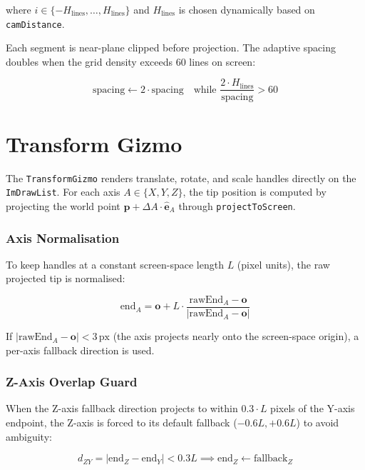 \documentclass[12pt, a4paper]{report}
\theoremstyle{definition}
\theoremstyle{remark}
\begin{document}
where $i \in \{-H_\text{lines}, \ldots, H_\text{lines}\}$ and
$H_\text{lines}$ is chosen dynamically based on \texttt{camDistance}.

Each segment is near-plane clipped before projection. The adaptive
spacing doubles when the grid density exceeds 60 lines on screen:

\begin{equation}
\text{spacing} \leftarrow 2 \cdot \text{spacing}
\quad \text{while } \frac{2 \cdot H_\text{lines}}{\text{spacing}} > 60
\end{equation}

\section{Transform Gizmo}

The \texttt{TransformGizmo} renders translate, rotate, and scale handles
directly on the \texttt{ImDrawList}. For each axis $A \in \{X, Y, Z\}$,
the tip position is computed by projecting the world point
$\mathbf{p} + \Delta A \cdot \hat{\mathbf{e}}_A$ through
\texttt{projectToScreen}.

\subsubsection{Axis Normalisation}

To keep handles at a constant screen-space length $L$ (pixel units),
the raw projected tip is normalised:

\begin{equation}
\text{end}_A = \mathbf{o} + L \cdot \frac{\text{rawEnd}_A - \mathbf{o}}{|\text{rawEnd}_A - \mathbf{o}|}
\end{equation}

If $|\text{rawEnd}_A - \mathbf{o}| < 3\,\text{px}$ (the axis projects
nearly onto the screen-space origin), a per-axis fallback direction is used.

\subsubsection{Z-Axis Overlap Guard}

When the Z-axis fallback direction projects to within
$0.3 \cdot L$ pixels of the Y-axis endpoint, the Z-axis is forced to
its default fallback ($-0.6L, +0.6L$) to avoid ambiguity:

\begin{equation}
d_{ZY} = |\text{end}_Z - \text{end}_Y| < 0.3L
\implies \text{end}_Z \leftarrow \text{fallback}_Z
\end{equation}
\end{document}
